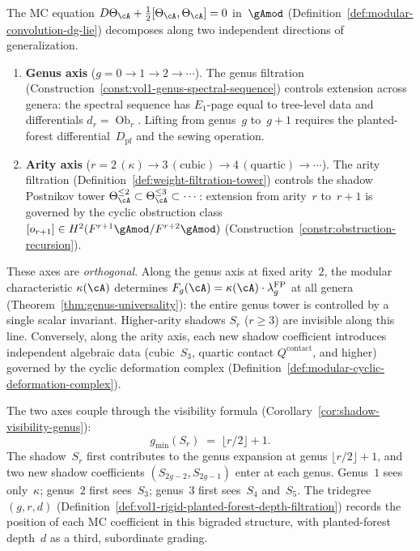 \begin{remark}
\label{rem:two-orthogonal-axes}
The MC equation
$D\Theta_\cA + \tfrac{1}{2}[\Theta_\cA, \Theta_\cA] = 0$
in~$\gAmod$
(Definition~\ref{def:modular-convolution-dg-lie})
decomposes along two independent directions of generalization.
\begin{enumerate}[label=\textup{(\roman*)}]
\item \textbf{Genus axis} ($g = 0 \to 1 \to 2 \to \cdots$).
The genus filtration
(Construction~\ref{const:vol1-genus-spectral-sequence})
controls extension across genera: the spectral sequence has
$E_1$-page equal to tree-level data and differentials
$d_r = \operatorname{Ob}_r$.
Lifting from genus~$g$ to~$g{+}1$ requires the planted-forest
differential~$D_{\mathrm{pf}}$ and the sewing operation.
\item \textbf{Arity axis} ($r = 2\,(\kappa) \to 3\,(\text{cubic})
\to 4\,(\text{quartic}) \to \cdots$).
The arity filtration
(Definition~\ref{def:weight-filtration-tower})
controls the shadow Postnikov tower
$\Theta_\cA^{\leq 2} \subset \Theta_\cA^{\leq 3} \subset \cdots$:
extension from arity~$r$ to~$r{+}1$ is governed by the cyclic
obstruction class
$[o_{r+1}] \in H^2(F^{r+1}\gAmod / F^{r+2}\gAmod)$
(Construction~\ref{constr:obstruction-recursion}).
\end{enumerate}
These axes are \emph{orthogonal}.
Along the genus axis at fixed arity~$2$, the modular characteristic
$\kappa(\cA)$ determines $F_g(\cA) = \kappa(\cA) \cdot \lambda_g^{\mathrm{FP}}$
at all genera
(Theorem~\ref{thm:genus-universality}): the entire genus
tower is controlled by a single scalar invariant.
Higher-arity shadows $S_r$ ($r \geq 3$) are invisible along
this line.
Conversely, along the arity axis, each new shadow coefficient introduces
independent algebraic data (cubic~$S_3$, quartic contact
$Q^{\mathrm{contact}}$, and higher) governed by the cyclic deformation
complex
(Definition~\ref{def:modular-cyclic-deformation-complex}).

The two axes couple through the visibility formula
(Corollary~\ref{cor:shadow-visibility-genus}):
\[
g_{\min}(S_r) \;=\; \lfloor r/2 \rfloor + 1.
\]
The shadow~$S_r$ first contributes to the genus expansion at genus
$\lfloor r/2 \rfloor + 1$, and two new shadow coefficients
$(S_{2g-2}, S_{2g-1})$ enter at each genus.
Genus~$1$ sees only~$\kappa$;
genus~$2$ first sees~$S_3$;
genus~$3$ first sees~$S_4$ and~$S_5$.
The tridegree $(g, r, d)$
(Definition~\ref{def:vol1-rigid-planted-forest-depth-filtration})
records the position of each MC coefficient in this bigraded
structure, with planted-forest depth~$d$ as a third, subordinate
grading.
\end{remark}

